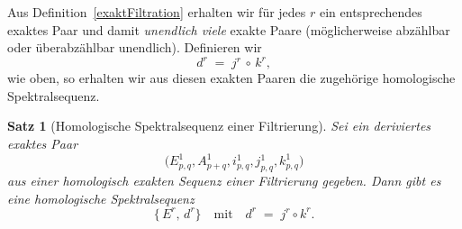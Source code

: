 \documentclass[12pt, hidelinks]{article}
\numberwithin{conj}{section}
\newtheorem{theorem}[conj]{Satz}
\begin{document}
Aus Definition~\ref{exaktFiltration} erhalten wir für jedes $r$ ein entsprechendes exaktes Paar und damit \emph{unendlich viele} exakte Paare (möglicherweise abzählbar oder überabzählbar unendlich). Definieren wir 
\[
    d^r \;=\; j^r \,\circ\, k^r,
\]
wie oben, so erhalten wir aus diesen exakten Paaren die zugehörige homologische Spektralsequenz.

\begin{theorem}[Homologische Spektralsequenz einer Filtrierung]
Sei ein deriviertes exaktes Paar
\[
    \bigl(E^1_{p,q}, A^1_{p+q}, i^1_{p,q}, j^1_{p,q}, k^1_{p,q}\bigr)
\]
aus einer homologisch exakten Sequenz einer Filtrierung gegeben. Dann gibt es eine homologische Spektralsequenz
\[
    \{\,E^r,\,d^r\}\quad\text{mit}\quad d^r \;=\; j^r \circ k^r.
\]
\end{theorem}
\end{document}
